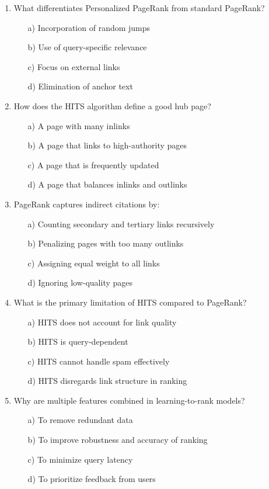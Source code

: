 \documentclass[8pt]{extarticle}
\begin{document}
\begin{multicols}{2}
\begin{enumerate}
\item What differentiates Personalized PageRank from standard PageRank?
\begin{itemize}
\item[a)] Incorporation of random jumps
\item[b)] Use of query-specific relevance
\item[c)] Focus on external links
\item[d)] Elimination of anchor text
\end{itemize}

\item How does the HITS algorithm define a good hub page?
\begin{itemize}
\item[a)] A page with many inlinks
\item[b)] A page that links to high-authority pages
\item[c)] A page that is frequently updated
\item[d)] A page that balances inlinks and outlinks
\end{itemize}

\item PageRank captures indirect citations by:
\begin{itemize}
\item[a)] Counting secondary and tertiary links recursively
\item[b)] Penalizing pages with too many outlinks
\item[c)] Assigning equal weight to all links
\item[d)] Ignoring low-quality pages
\end{itemize}

\item What is the primary limitation of HITS compared to PageRank?
\begin{itemize}
\item[a)] HITS does not account for link quality
\item[b)] HITS is query-dependent
\item[c)] HITS cannot handle spam effectively
\item[d)] HITS disregards link structure in ranking
\end{itemize}


\item Why are multiple features combined in learning-to-rank models?
\begin{itemize}
\item[a)] To remove redundant data
\item[b)] To improve robustness and accuracy of ranking
\item[c)] To minimize query latency
\item[d)] To prioritize feedback from users
\end{itemize}


\end{enumerate}
\end{multicols}
\end{document}
